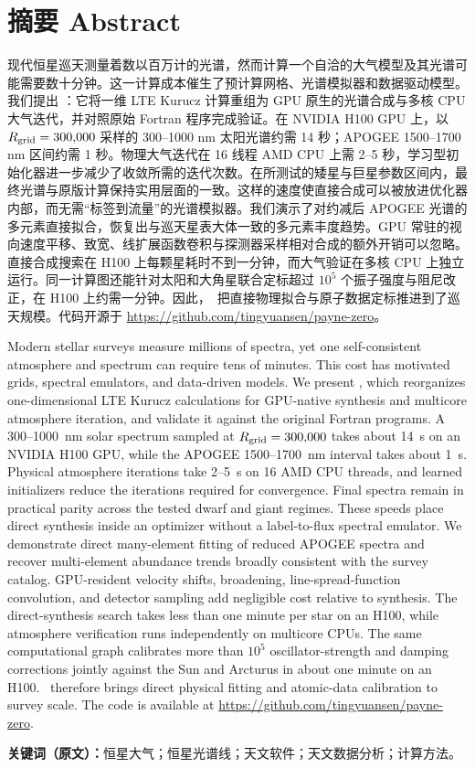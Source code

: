 \section*{摘要 Abstract}

现代恒星巡天测量着数以百万计的光谱，然而计算一个自洽的大气模型及其光谱可能需要数十分钟。这一计算成本催生了预计算网格、光谱模拟器和数据驱动模型。我们提出 \paynezero：它将一维 LTE Kurucz 计算重组为 GPU 原生的光谱合成与多核 CPU 大气迭代，并对照原始 Fortran 程序完成验证。在 NVIDIA H100 GPU 上，以 $R_{\rm grid}=300{,}000$ 采样的 300--1000 nm 太阳光谱约需 14 秒；APOGEE 1500--1700 nm 区间约需 1 秒。物理大气迭代在 16 线程 AMD CPU 上需 2--5 秒，学习型初始化器进一步减少了收敛所需的迭代次数。在所测试的矮星与巨星参数区间内，最终光谱与原版计算保持实用层面的一致。这样的速度使直接合成可以被放进优化器内部，而无需“标签到流量”的光谱模拟器。我们演示了对约减后 APOGEE 光谱的多元素直接拟合，恢复出与巡天星表大体一致的多元素丰度趋势。GPU 常驻的视向速度平移、致宽、线扩展函数卷积与探测器采样相对合成的额外开销可以忽略。直接合成搜索在 H100 上每颗星耗时不到一分钟，而大气验证在多核 CPU 上独立运行。同一计算图还能针对太阳和大角星联合定标超过 $10^5$ 个振子强度与阻尼改正，在 H100 上约需一分钟。因此，\paynezero\ 把直接物理拟合与原子数据定标推进到了巡天规模。代码开源于 \url{https://github.com/tingyuansen/payne-zero}。

\begin{EN}
Modern stellar surveys measure millions of spectra, yet one self-consistent
atmosphere and spectrum can require tens of minutes. This cost has motivated
grids, spectral emulators, and data-driven models. We present \paynezero, which
reorganizes one-dimensional LTE Kurucz calculations for GPU-native synthesis
and multicore atmosphere iteration, and validate it against the original
Fortran programs. A
300--1000~nm solar spectrum sampled at $R_{\rm grid}=300{,}000$ takes about
14~s on an NVIDIA H100 GPU, while the APOGEE 1500--1700~nm interval takes about
1~s. Physical atmosphere iterations take 2--5~s on 16 AMD CPU threads, and
learned initializers reduce the iterations required for convergence. Final
spectra remain in practical parity across the tested dwarf and giant regimes.
These speeds place direct synthesis inside an optimizer without a
label-to-flux spectral emulator. We demonstrate direct many-element fitting of
reduced APOGEE spectra and recover multi-element abundance trends broadly
consistent with the survey catalog.
GPU-resident velocity shifts, broadening, line-spread-function convolution,
and detector sampling add negligible cost relative to synthesis.
The direct-synthesis search takes less than one minute per star on an H100, while
atmosphere verification runs independently on multicore CPUs. The same
computational graph calibrates more than $10^5$ oscillator-strength and
damping corrections jointly against the Sun and
Arcturus in about one minute on an H100. \paynezero\ therefore brings direct
physical fitting and atomic-data calibration to survey scale. The code is
available at \url{https://github.com/tingyuansen/payne-zero}.
\end{EN}

\noindent\textbf{关键词（原文）：}恒星大气；恒星光谱线；天文软件；天文数据分析；计算方法。

